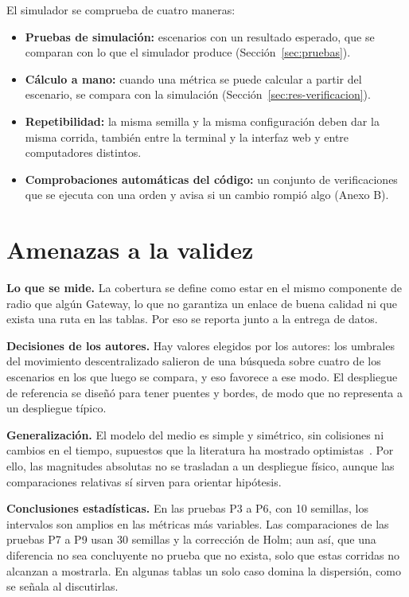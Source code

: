El simulador se comprueba de cuatro maneras:

\begin{itemize}
\item \textbf{Pruebas de simulación:} escenarios con un resultado esperado, que
se comparan con lo que el simulador produce (Sección~\ref{sec:pruebas}).
\item \textbf{Cálculo a mano:} cuando una métrica se puede calcular a partir del
escenario, se compara con la simulación (Sección~\ref{sec:res-verificacion}).
\item \textbf{Repetibilidad:} la misma semilla y la misma configuración deben
dar la misma corrida, también entre la terminal y la interfaz web y entre
computadores distintos.
\item \textbf{Comprobaciones automáticas del código:} un conjunto de
verificaciones que se ejecuta con una orden y avisa si un cambio rompió algo
(Anexo B).
\end{itemize}

\section{Amenazas a la validez}
\label{sec:amenazas}

\textbf{Lo que se mide.} La cobertura se define como estar en el mismo
componente de radio que algún Gateway, lo que no garantiza un enlace de buena
calidad ni que exista una ruta en las tablas. Por eso se reporta junto a la
entrega de datos.

\textbf{Decisiones de los autores.} Hay valores elegidos por los autores: los
umbrales del movimiento descentralizado salieron de una búsqueda sobre cuatro
de los escenarios en los que luego se compara, y eso favorece a ese modo. El
despliegue de referencia se diseñó para tener puentes y bordes, de modo que no
representa a un despliegue típico.

\textbf{Generalización.} El modelo del medio es simple y simétrico, sin
colisiones ni cambios en el tiempo, supuestos que la literatura ha mostrado
optimistas~\cite{Kotz2004Assumptions}. Por ello, las magnitudes absolutas no se
trasladan a un despliegue físico, aunque las comparaciones relativas sí sirven
para orientar hipótesis.

\textbf{Conclusiones estadísticas.} En las pruebas P3 a P6, con 10 semillas,
los intervalos son amplios en las métricas más variables. Las comparaciones de
las pruebas P7 a P9 usan 30 semillas y la corrección de Holm; aun así, que una
diferencia no sea concluyente no prueba que no exista, solo que estas corridas
no alcanzan a mostrarla. En algunas tablas un solo caso domina la dispersión,
como se señala al discutirlas.

